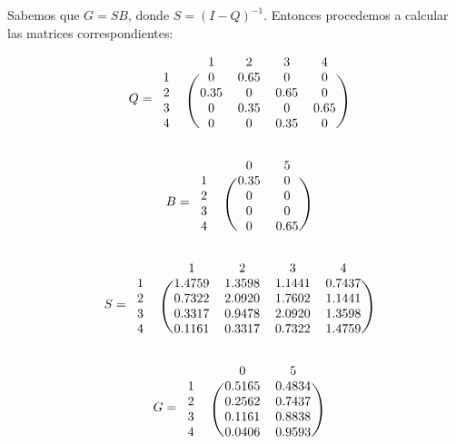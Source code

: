 \documentclass[11pt]{article}
\begin{document}
Sabemos que $ G = SB $, donde $ S = (I - Q)^{-1} $. Entonces procedemos a 
calcular las matrices correspondientes:

\begin{equation*}
  Q = 
  \begin{blockarray}{cccccc}
     & & 1 & 2 & 3 & 4 \\
    \begin{block}{cc(cccc)}
      1 & & 0    & 0.65 & 0    & 0    \\
      2 & & 0.35 & 0    & 0.65 & 0    \\
      3 & & 0    & 0.35 & 0    & 0.65 \\
      4 & & 0    & 0    & 0.35 & 0    \\
    \end{block}
  \end{blockarray}
\end{equation*}

\begin{equation*}
  B = 
  \begin{blockarray}{cccc}
     & & 0 & 5 \\
    \begin{block}{cc(cc)}
      1 & & 0.35 & 0   \\
      2 & & 0    & 0   \\
      3 & & 0    & 0   \\
      4 & & 0    & 0.65 \\
    \end{block}
  \end{blockarray}
\end{equation*}

\begin{equation*}
  S = 
  \begin{blockarray}{cccccc}
     & & 1 & 2 & 3 & 4 \\
    \begin{block}{cc(cccc)}
      1 & & 1.4759 & 1.3598 & 1.1441 & 0.7437 \\
      2 & & 0.7322 & 2.0920 & 1.7602 & 1.1441 \\
      3 & & 0.3317 & 0.9478 & 2.0920 & 1.3598 \\
      4 & & 0.1161 & 0.3317 & 0.7322 & 1.4759 \\
    \end{block}
  \end{blockarray}
\end{equation*}

\begin{equation*}
  G = 
  \begin{blockarray}{cccc}
     & & 0 & 5 \\
    \begin{block}{cc(cc)}
      1 & & 0.5165 & 0.4834 \\
      2 & & 0.2562 & 0.7437 \\
      3 & & 0.1161 & 0.8838 \\
      4 & & 0.0406 & 0.9593 \\
    \end{block}
  \end{blockarray}
\end{equation*}
\end{document}
